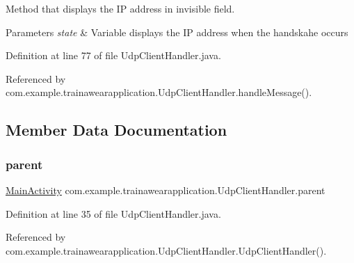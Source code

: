 Method that displays the IP address in invisible field. 


\begin{DoxyParams}{Parameters}
{\em state} & Variable displays the IP address when the handskahe occurs \\
\hline
\end{DoxyParams}


Definition at line 77 of file Udp\+Client\+Handler.\+java.


\begin{DoxyCode}{0}

\end{DoxyCode}


Referenced by com.\+example.\+trainawearapplication.\+Udp\+Client\+Handler.\+handle\+Message().



\subsection{Member Data Documentation}
\mbox{\label{classcom_1_1example_1_1trainawearapplication_1_1_udp_client_handler_a93942bc64a7d7d570d27c9e485d361e4}} 
\subsubsection{\texorpdfstring{parent}{parent}}
{\footnotesize\ttfamily \mbox{\hyperlink{classcom_1_1example_1_1trainawearapplication_1_1_main_activity}{Main\+Activity}} com.\+example.\+trainawearapplication.\+Udp\+Client\+Handler.\+parent\hspace{0.3cm}{\ttfamily [private]}}



Definition at line 35 of file Udp\+Client\+Handler.\+java.



Referenced by com.\+example.\+trainawearapplication.\+Udp\+Client\+Handler.\+Udp\+Client\+Handler().

